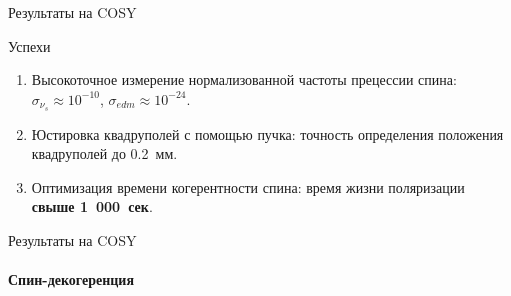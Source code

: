 \documentclass[14pt]{beamer}
\begin{document}
\begin{frame}{Результаты на COSY}
	\begin{block}{Успехи}
		\begin{enumerate}
			\item Высокоточное измерение нормализованной частоты прецессии спина: $\sigma_{\nu_s}\approx 10^{-10}$, $\sigma_{edm}\approx 10^{-24}$\ecm.
			\item Юстировка квадруполей с помощью пучка: точность определения положения квадруполей до 0.2~мм.
			\item Оптимизация времени когерентности спина: время жизни поляризации \textbf{свыше 1~000~сек}.
		\end{enumerate}
	\end{block}
\end{frame}
\begin{frame}{Результаты на COSY}
	\framesubtitle{Спин-декогеренция}
	\centering
\end{frame}
\end{document}
